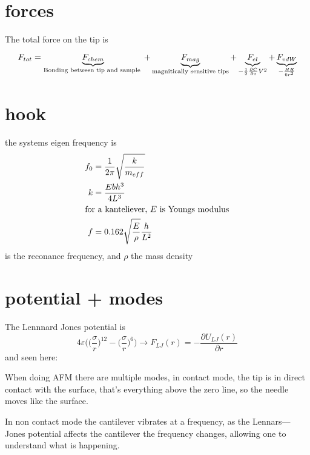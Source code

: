 \documentclass[article,oneside]{memoir}
\begin{document}

\section{forces}
The total force on the tip is


\begin{equation*}
        F_{tot}=\underbrace{F_{chem}}_{\textup{Bonding between tip and sample }}+\underbrace{F_{mag}}_{\textup{magnitically sensitive tips}}+\underbrace{F_{el}}_{-\frac{1}{2}\frac{\partial C}{\partial z}V^2}+\underbrace{F_{vdW}}_{-\frac{HR}{6r^2}}
\end{equation*}
\section{hook}
the systems eigen frequency is
\begin{align*}
        f_{0}&=\frac{1}{2\pi}\sqrt{\frac{k}{m_{eff}}}\\
        k &= \frac{Ebh^3}{4L^3}\\
        \intertext{for a kanteliever, $E$ is Youngs modulus}
        f&=0.162\sqrt{\frac{E}{\rho}}\frac{h}{L^2}
\end{align*}
is the reconance frequency, and $\rho$ the mass density
\section{potential + modes}
The Lennnard Jones potential is\begin{equation*}4\varepsilon\bigg(\big(\frac{\sigma}{r}\big)^{12}-\big(\frac{\sigma}{r}\big)^{6}\bigg)\rightarrow F_{LJ}(r) =-\frac{\partial U_{LJ}(r)}{\partial r}\end{equation*} and seen here:


When doing AFM there are multiple modes, in contact mode, the tip is in direct contact with the surface, that's everything above the zero line, so the needle moves like the surface. 

In non contact mode the cantilever vibrates at a frequency, as the Lennars---Jones potential affects the cantilever the frequency changes, allowing one to understand what is happening.
\end{document}
